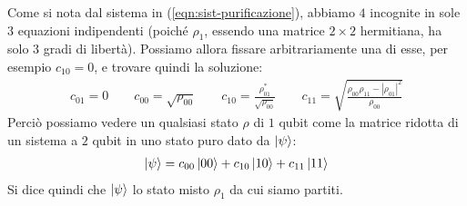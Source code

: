 \documentclass[../../InformazioneQuantistica.tex]{subfiles}
\begin{document}
Come si nota dal sistema in (\ref{eqn:sist-purificazione}), abbiamo $4$ incognite in sole $3$ equazioni indipendenti (poiché $\rho_1$, essendo una matrice $2\times 2$ hermitiana, ha solo $3$ gradi di libertà). Possiamo allora fissare arbitrariamente una di esse, per esempio $c_{10}=0$, e trovare quindi la soluzione:
\begin{align*}
c_{01} = 0 \qquad c_{00} = \sqrt{\rho_{00}} \qquad c_{10}=\frac{\rho_{01}^*}{\sqrt{\rho_{00}}} \qquad c_{11} = \sqrt{\frac{\rho_{00}\rho_{11} - |\rho_{01}|^2}{\rho_{00}}}
\end{align*}
Perciò possiamo vedere un qualsiasi stato $\rho$ di $1$ qubit come la matrice ridotta di un sistema a $2$ qubit in uno stato puro dato da $\Ket{\psi}$:
\begin{align*}
\Ket{\psi} = c_{00}\Ket{00} + c_{10}\Ket{10} + c_{11}\Ket{11}
\end{align*}
Si dice quindi che $\Ket{\psi}$  lo stato misto $\rho_1$ da cui siamo partiti.


\end{document}
